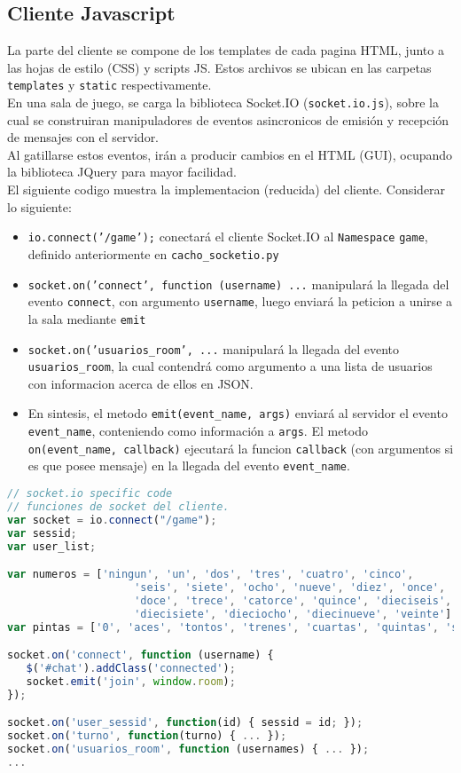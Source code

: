\subsection{Cliente Javascript}
La parte del cliente se compone de los templates
de cada pagina HTML, junto a las hojas de estilo (CSS)
y scripts JS. Estos archivos se ubican en las carpetas
\texttt{templates} y \texttt{static} respectivamente. \\

En una sala de juego, se carga la biblioteca Socket.IO
(\texttt{socket.io.js}), sobre la cual se construiran manipuladores de eventos asincronicos de emisión y recepción de mensajes con el servidor.\\

Al gatillarse estos eventos, irán a producir cambios en el HTML (GUI),
ocupando la biblioteca JQuery para mayor facilidad.\\

El siguiente codigo muestra la implementacion (reducida) del cliente. Considerar lo siguiente:
\begin{itemize}
	\item \texttt{io.connect('/game');} conectará el cliente Socket.IO al \texttt{Namespace}
	\texttt{game}, definido anteriormente en \texttt{cacho\_socketio.py}
	\item \texttt{socket.on('connect', function (username) ...} manipulará la llegada del evento
	\texttt{connect}, con argumento \texttt{username}, luego enviará la peticion a unirse a la sala
	mediante \texttt{emit}
	\item \texttt{socket.on('usuarios\_room', ...} manipulará la llegada del evento \texttt{usuarios\_room}, la cual contendrá como argumento a una lista de usuarios con informacion acerca de ellos en JSON.
	\item En sintesis, el metodo \texttt{emit(event\_name, args)} enviará al servidor el evento \texttt{event\_name},
	conteniendo como información a \texttt{args}. El metodo \texttt{on(event\_name, callback)} ejecutará
	la funcion \texttt{callback} (con argumentos si es que posee mensaje) en la llegada del evento \texttt{event\_name}.
\end{itemize}

\begin{lstlisting}[language=JavaScript, caption=cacho\_app/static/js/cacho.js]
// socket.io specific code
// funciones de socket del cliente.
var socket = io.connect("/game");
var sessid;
var user_list;

var numeros = ['ningun', 'un', 'dos', 'tres', 'cuatro', 'cinco',
					'seis', 'siete', 'ocho', 'nueve', 'diez', 'once',
					'doce', 'trece', 'catorce', 'quince', 'dieciseis',
					'diecisiete', 'dieciocho', 'diecinueve', 'veinte']
var pintas = ['0', 'aces', 'tontos', 'trenes', 'cuartas', 'quintas', 'sextas']

socket.on('connect', function (username) {
   $('#chat').addClass('connected');
   socket.emit('join', window.room);
});

socket.on('user_sessid', function(id) { sessid = id; });
socket.on('turno', function(turno) { ... });
socket.on('usuarios_room', function (usernames) { ... });
...
\end{lstlisting}




